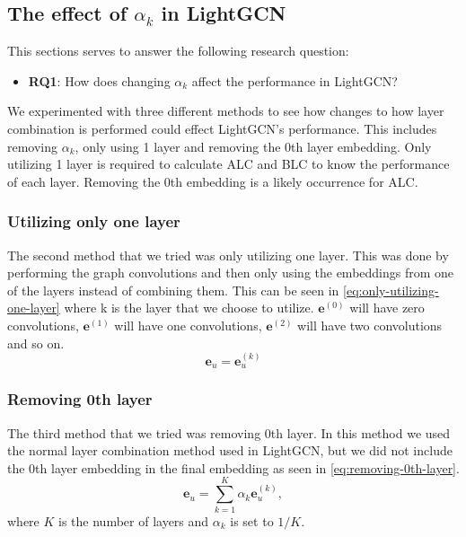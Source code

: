 \subsection{The effect of $\alpha_k$ in LightGCN}\label{sec:method:alpha-k-effect}
This sections serves to answer the following research question:
\begin{itemize}
	\item \textbf{RQ1}: How does changing $\alpha_k$ affect the performance in LightGCN?
\end{itemize}
We experimented with three different methods to see how changes to how layer combination is performed could effect LightGCN's performance.
This includes removing $\alpha_k$, only using 1 layer and removing the 0th layer embedding.
Only utilizing 1 layer is required to calculate ALC and BLC to know the performance of each layer.
Removing the 0th embedding is a likely occurrence for ALC.

\subsubsection{Utilizing only one layer}\label{subsubsec:only-1-layer}
The second method that we tried was only utilizing one layer.
This was done by performing the graph convolutions and then only using the embeddings from one of the layers instead of combining them.
This can be seen in \autoref{eq:only-utilizing-one-layer} where k is the layer that we choose to utilize. 
$\mathbf{e}^{(0)}$ will have zero convolutions, $\mathbf{e}^{(1)}$ will have one convolutions, $\mathbf{e}^{(2)}$ will have two convolutions and so on.
\begin{equation}
	\mathbf{e}_u = \mathbf{e}_u^{(k)}
	\label{eq:only-utilizing-one-layer}
\end{equation}

\subsubsection{Removing 0th layer}
The third method that we tried was removing 0th layer.
In this method we used the normal layer combination method used in LightGCN, but we did not include the 0th layer embedding in the final embedding as seen in \autoref{eq:removing-0th-layer}.
\begin{equation}
	\mathbf{e}_u = \sum_{k=1}^{K} \alpha_k \mathbf{e}_u^{(k)},
	\label{eq:removing-0th-layer}
\end{equation}
where $K$ is the number of layers and $\alpha_k$ is set to $1/K$.
